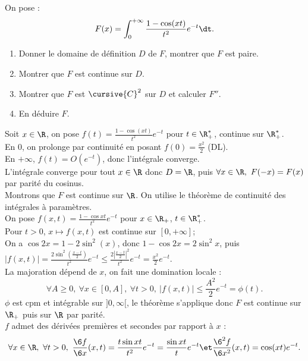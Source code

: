 \documentclass[11pt]{article}
\begin{document}
\begin{ex}{}{}
    On pose :
    \begin{equation*}
        F(x) = \int_0^{+\infty} \frac{1-\cos(xt)}{t^2}e^{-t}\dt.
    \end{equation*}
    \begin{enumerate}
        \item Donner le domaine de définition $D$ de $F$, montrer que $F$ est paire.
        \item Montrer que $F$ est continue sur $D$.
        \item Montrer que $F$ est $\cursive{C}^2$ sur $D$ et calculer $F''$.
        \item En déduire $F$.
    \end{enumerate}
    \tcblower
     Soit $x\in\R$, on pose $f(t)=\frac{1-\cos(xt)}{t^2}e^{-t}$ pour $t\in\R_+^*$, continue sur $\R_+^*$.\\
    En 0, on prolonge par continuité en posant $f(0)=\frac{x^2}{2}$ (DL).\\
    En $+\infty$, $f(t)=O(e^{-t})$, donc l'intégrale converge.\\
    L'intégrale converge pour tout $x\in\R$ donc $D=\R$, puis $\forall x \in \R, ~ F(-x)=F(x)$ par parité du cosinus.\\
     Montrons que $F$ est continue sur $\R$. On utilise le théorème de continuité des intégrales à paramètres.\\
    On pose $f(x,t)=\frac{1-\cos xt}{t^2}e^{-t}$ pour $x\in\R_+$, $t\in\R^*_+$.\\
    Pour $t>0$, $x\mapsto f(x,t)$ est continue sur $[0,+\infty]$;\\
    On a $\cos 2x=1-2\sin^2(x)$, donc $1-\cos2x=2\sin^2x$, puis $|f(x,t)|=\frac{2\sin^2(\frac{x-t}{2})}{t^2}e^{-t}\leq\frac{2|\frac{x-t}{2}|^2}{t^2}e^{-t}=\frac{x^2}{2}e^{-t}$.\\
    La majoration dépend de $x$, on fait une domination locale :
    \begin{equation*}
        \forall A \geq 0, ~ \forall x \in [0,A], ~ \forall t >0, ~ |f(x,t)|\leq\frac{A^2}{2}e^{-t}=\phi(t).
    \end{equation*}
    $\phi$ est cpm et intégrable sur $]0,\infty[$, le théorème s'applique donc $F$ est continue sur $\R_+$ puis sur $\R$ par parité.\\
     $f$ admet des dérivées premières et secondes par rapport à $x$ :
    \begin{equation*}
        \forall x \in \R, ~ \forall t > 0, ~ \frac{\6 f}{\6 x}(x,t) = \frac{t\sin xt}{t^2}e^{-t} = \frac{\sin xt}{t}e^{-t} \et \frac{\6^2 f}{\6 x^2}(x,t)=\cos(xt)e^{-t}.

\end{equation*}
\end{ex}
\end{document}
